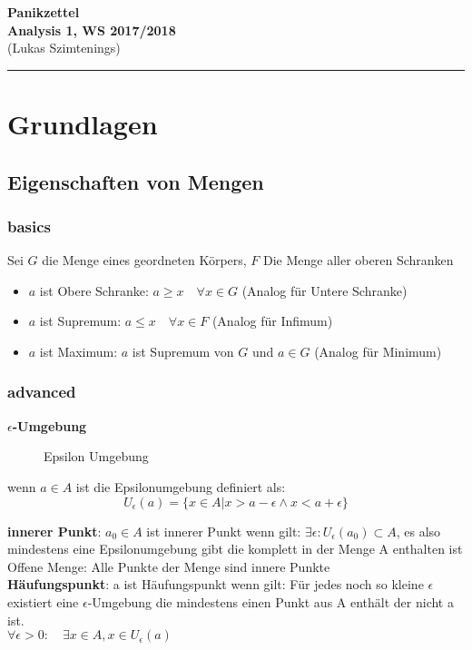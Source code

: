 \documentclass[12pt,a4paper]{article}
\begin{document}
\textbf{Panikzettel} \\ 
\textbf{Analysis 1, WS 2017/2018} \\
{\scriptsize (Lukas Szimtenings)}
\hrule 

\bigskip

\tableofcontents
\pagebreak
\section{Grundlagen}

\subsection{Eigenschaften von Mengen}

\subsubsection{basics}
Sei $G$ die Menge eines geordneten Körpers, $F$ Die Menge aller oberen Schranken
\begin{itemize}
\item $a$ ist Obere Schranke: $a\geq x\quad \forall x \in G$ (Analog für Untere Schranke)
\item $a$ ist Supremum: $a\leq x \quad \forall x \in F$ (Analog für Infimum)
\item $a$ ist Maximum: $a$ ist Supremum von $G$ und $a \in G$ (Analog für Minimum)
\end{itemize}


\subsubsection{advanced}
\textbf{$\epsilon$-Umgebung}\\
\begin{figure}[htbp]
  \centering
  
  \caption{Epsilon Umgebung}
\end{figure}
wenn $a\in A$ ist die Epsilonumgebung definiert als:\\
\[U_{\epsilon}(a)=\{ x\in A | x>a-\epsilon \wedge x<a+\epsilon\}\]


\textbf{innerer Punkt}: 
$a_0\in A$ ist innerer Punkt wenn gilt: $\exists \epsilon : U_{\epsilon}(a_0)\subset A$, es also mindestens eine Epsilonumgebung gibt die komplett in der Menge A enthalten ist\\
Offene Menge: Alle Punkte der Menge sind innere Punkte\\

\textbf{Häufungspunkt}: 
a ist Häufungspunkt wenn gilt: Für jedes noch so kleine $\epsilon$ existiert eine $\epsilon$-Umgebung die mindestens einen Punkt aus A enthält der nicht a ist.\\
$\forall \epsilon>0:\quad \exists x \in A, x \in U_{\epsilon}(a) $\\
\end{document}
